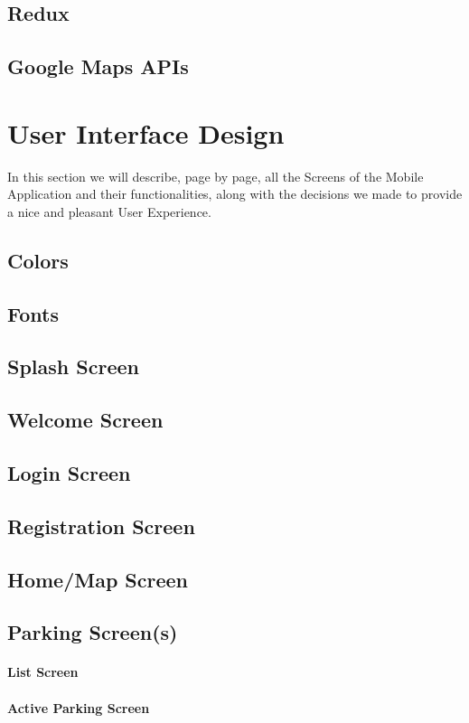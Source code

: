 \documentclass[11pt]{article} %
\begin{document}
\subsection{Redux}
\subsection{Google Maps APIs}


\section{User Interface Design}
In this section we will describe, page by page, all the Screens of the Mobile Application and their functionalities, along with the decisions we made to provide a nice and pleasant User Experience.
\subsection{Colors}
\subsection{Fonts}

\subsection{Splash Screen}
\subsection{Welcome Screen}
\subsection{Login Screen}
\subsection{Registration Screen}
\subsection{Home/Map Screen}
\subsection{Parking Screen(s)}
\paragraph{List Screen}
\paragraph{Active Parking Screen}
\end{document}

